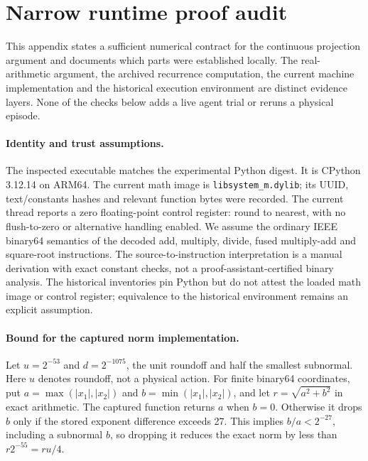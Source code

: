 \section{Narrow runtime proof audit}
\label{app:runtime-proof}

This appendix states a sufficient numerical contract for the continuous
projection argument and documents which parts were established locally.
The real-arithmetic argument, the archived recurrence computation, the
current machine implementation and the historical execution environment
are distinct evidence layers. None of the checks below adds a live agent
trial or reruns a physical episode.

\paragraph{Identity and trust assumptions.}
The inspected executable matches the experimental Python digest. It is
CPython 3.12.14 on ARM64. The current math image is
\texttt{libsystem\_m.dylib}; its UUID, text/constants hashes and relevant
function bytes were recorded. The current thread reports a zero floating-point
control register: round to nearest, with no flush-to-zero or alternative
handling enabled. We assume the ordinary IEEE binary64 semantics of
the decoded add, multiply, divide, fused multiply-add and square-root
instructions. The source-to-instruction interpretation is a manual
derivation with exact constant checks, not a proof-assistant-certified
binary analysis. The historical inventories pin Python but do not attest
the loaded math image or control register; equivalence to the historical
environment remains an explicit assumption.

\paragraph{Bound for the captured norm implementation.}
Let $u=2^{-53}$ and $d=2^{-1075}$, the unit roundoff and half the smallest
subnormal. Here $u$ denotes roundoff, not a physical action. For finite
binary64 coordinates, put $a=\max(|x_1|,|x_2|)$ and
$b=\min(|x_1|,|x_2|)$, and let $r=\sqrt{a^2+b^2}$ in exact arithmetic.
The captured function returns $a$ when $b=0$. Otherwise it drops $b$
only if the stored exponent difference exceeds 27. This implies
$b/a<2^{-27}$, including a subnormal $b$, so dropping it reduces the
exact norm by less than $r2^{-55}=ru/4$.

